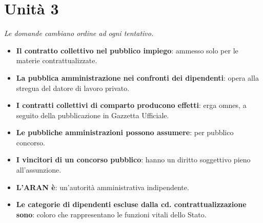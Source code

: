 \documentclass[12pt, a4paper]{report}
\begin{document}
\chapter{Unità 3}
    \textit{Le domande cambiano ordine ad ogni tentativo.}
    \begin{itemize}
        \item \textbf{Il contratto collettivo nel pubblico impiego}: ammesso solo per le materie contrattualizzate.
        \item \textbf{La pubblica amministrazione nei confronti dei dipendenti}: opera alla stregua del datore di lavoro privato.
        \item \textbf{I contratti collettivi di comparto producono effetti}: erga omnes, a seguito della pubblicazione in Gazzetta Ufficiale.
        \item \textbf{Le pubbliche amministrazioni possono assumere}: per pubblico concorso.
        \item \textbf{I vincitori di un concorso pubblico}: hanno un diritto soggettivo pieno all’assunzione.
        \item \textbf{L’ARAN è}: un’autorità amministrativa indipendente.
        \item \textbf{Le categorie di dipendenti escluse dalla cd. contrattualizzazione sono}: coloro che rappresentano le funzioni vitali dello Stato.
    \end{itemize}
\end{document}
